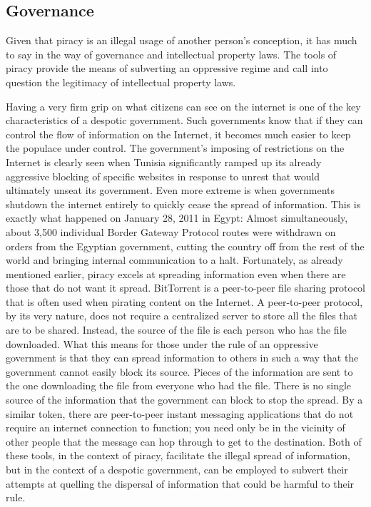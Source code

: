 \documentclass[onecolumn, 12pt]{article}
\begin{document}
\begin{refsection}
\subsection{Governance}
Given that piracy is an illegal usage of another person's conception, it has much to say
in the way of governance and intellectual property laws. The tools of piracy provide the
means of subverting an oppressive regime and call into question the legitimacy of
intellectual property laws.

Having a very firm grip on what citizens can see on the internet is one of the key
characteristics of a despotic government. Such governments know that if they can control
the flow of information on the Internet, it becomes much easier to keep the populace under
control. The government's imposing of restrictions on the Internet is clearly seen when
 {Tunisia significantly ramped up its already aggressive
blocking of specific websites in response to unrest that would ultimately unseat its
government.} Even more extreme is when governments shutdown the internet entirely to
quickly cease the spread of information. This is exactly what happened on January 28, 2011
in Egypt:  {Almost simultaneously, about 3,500 individual
Border Gateway Protocol routes \textelp{} were withdrawn on orders from the Egyptian
government, cutting the country off from the rest of the world and bringing internal
communication to a halt.} Fortunately, as already mentioned earlier, piracy excels at
spreading information even when there are those that do not want it spread. BitTorrent is
a peer-to-peer file sharing protocol that is often used when pirating content on the
Internet. A peer-to-peer protocol, by its very nature, does not require a centralized
server to store all the files that are to be shared. Instead, the source of the file is
each person who has the file downloaded. What this means for those under the rule of an
oppressive government is that they can spread information to others in such a way that the
government cannot easily block its source. Pieces of the information are sent to the one
downloading the file from everyone who had the file. There is no single source of the
information that the government can block to stop the spread. By a similar token, there
are peer-to-peer instant messaging applications that do not require an internet connection
to function; you need only be in the vicinity of other people that the message can hop
through to get to the destination. Both of these tools, in the context of piracy, facilitate
the illegal spread of information, but in the context of a despotic government, can be
employed to subvert their attempts at quelling the dispersal of information that could be
harmful to their rule.


\end{refsection}
\end{document}
